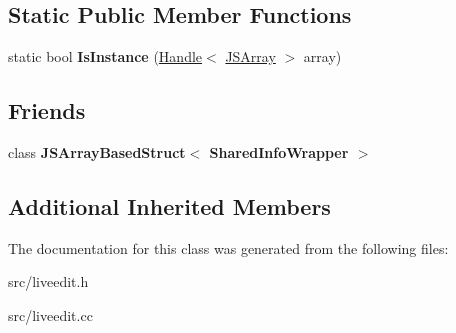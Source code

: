 \subsection*{Static Public Member Functions}
\begin{DoxyCompactItemize}
\item 
\hypertarget{classv8_1_1internal_1_1_shared_info_wrapper_a1c08fcb40e25b98fe0ca70ee17e7a5a6}{}static bool {\bfseries Is\+Instance} (\hyperlink{classv8_1_1internal_1_1_handle}{Handle}$<$ \hyperlink{classv8_1_1internal_1_1_j_s_array}{J\+S\+Array} $>$ array)\label{classv8_1_1internal_1_1_shared_info_wrapper_a1c08fcb40e25b98fe0ca70ee17e7a5a6}

\end{DoxyCompactItemize}
\subsection*{Friends}
\begin{DoxyCompactItemize}
\item 
\hypertarget{classv8_1_1internal_1_1_shared_info_wrapper_a44aa8ab054415f7265444059c27b4cdc}{}class {\bfseries J\+S\+Array\+Based\+Struct$<$ Shared\+Info\+Wrapper $>$}\label{classv8_1_1internal_1_1_shared_info_wrapper_a44aa8ab054415f7265444059c27b4cdc}

\end{DoxyCompactItemize}
\subsection*{Additional Inherited Members}


The documentation for this class was generated from the following files\+:\begin{DoxyCompactItemize}
\item 
src/liveedit.\+h\item 
src/liveedit.\+cc\end{DoxyCompactItemize}
